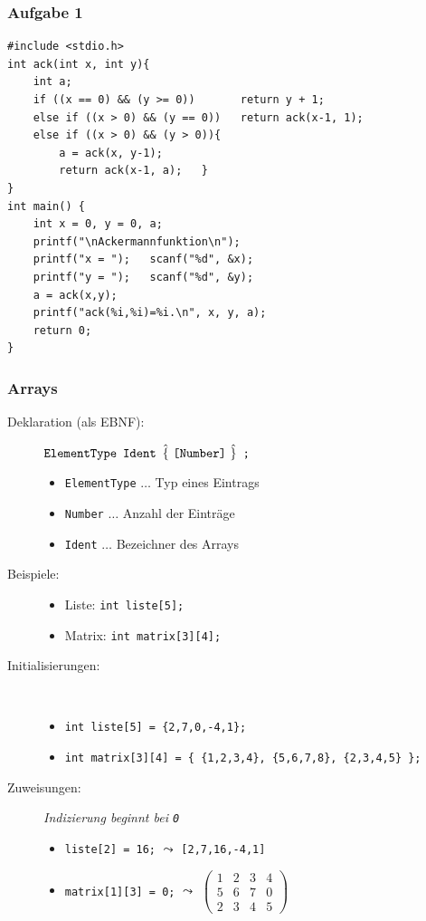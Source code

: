 \documentclass{beamer}
\begin{document}
\begin{frame}[fragile] \frametitle{Aufgabe 1}
	\footnotesize
\begin{lstlisting}
#include <stdio.h>
int ack(int x, int y){
	int a;
	if ((x == 0) && (y >= 0))       return y + 1;
	else if ((x > 0) && (y == 0))   return ack(x-1, 1);
	else if ((x > 0) && (y > 0)){
		a = ack(x, y-1);
		return ack(x-1, a);   }
}
int main() {
	int x = 0, y = 0, a;
	printf("\nAckermannfunktion\n");
	printf("x = ");   scanf("%d", &x);
	printf("y = ");   scanf("%d", &y);
	a = ack(x,y);
	printf("ack(%i,%i)=%i.\n", x, y, a);
	return 0;
}
\end{lstlisting}
\end{frame}

\begin{frame}[fragile] \frametitle{Arrays}
	\small
	\begin{description}
		\item[Deklaration (als EBNF):]
		$\texttt{ElementType} \enskip \texttt{Ident} \enskip \hat{\{} \ \texttt{[} \texttt{Number} \texttt{]} \ \hat{\}}\enskip  \texttt{;}$
		\begin{itemize}
			\item \texttt{ElementType} $\dots$ Typ eines Eintrags
			\item \texttt{Number} $\dots$ Anzahl der Einträge
			\item \texttt{Ident} $\dots$ Bezeichner des Arrays
		\end{itemize}
		\pause
		\item[Beispiele:]
		\begin{itemize}
			\item Liste: \lstinline{int liste[5];}
			\item Matrix: \lstinline{int matrix[3][4];}
		\end{itemize}
		\pause
		\item[Initialisierungen:] ~
		\begin{itemize}
			\item \lstinline|int liste[5] = {2,7,0,-4,1};|
			\item \lstinline|int matrix[3][4] = { {1,2,3,4}, {5,6,7,8}, {2,3,4,5} };|
		\end{itemize}
		\pause
		\item[Zuweisungen:] \textit{Indizierung beginnt bei \texttt{0}}
		\begin{itemize}
			\item \lstinline{liste[2] = 16;} $\leadsto$ \lstinline{[2,7,16,-4,1]} 
			\item \lstinline{matrix[1][3] = 0;} $\leadsto$ $\left( \begin{smallmatrix} 1 & 2 & 3 & 4 \\ 5 & 6 & 7 & 0 \\ 2 & 3 & 4 & 5 \end{smallmatrix} \right)$
		\end{itemize}
	\end{description}
\end{frame}
\end{document}
